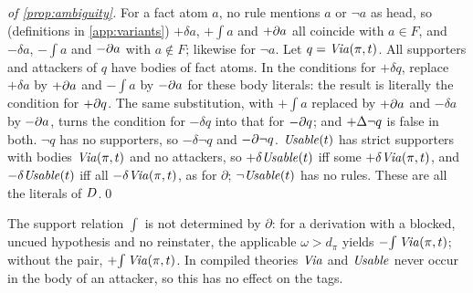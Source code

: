 \begin{proof}[of \cref{prop:ambiguity}]
For a fact atom $a$, no rule mentions $a$ or $\neg a$ as head, so (definitions in \cref{app:variants}) $+\delta a$, $+\!\int a$ and $+\partial a$ all coincide with $a\in F$, and $-\delta a$, $-\!\int a$ and $-\partial a$ with $a\notin F$; likewise for $\neg a$. Let $q=\mathit{Via}(\pi,t)$. All supporters and attackers of $q$ have bodies of fact atoms. In the conditions for $+\delta q$, replace $+\delta a$ by $+\partial a$ and $-\!\int a$ by $-\partial a$ for these body literals: the result is literally the condition for $+\partial q$. The same substitution, with $+\!\int a$ replaced by $+\partial a$ and $-\delta a$ by $-\partial a$, turns the condition for $-\delta q$ into that for $-\partial q$; and $+\Delta\neg q$ is false in both. $\neg q$ has no supporters, so $-\delta\neg q$ and $-\partial\neg q$. $\mathit{Usable}(t)$ has strict supporters with bodies $\mathit{Via}(\pi,t)$ and no attackers, so $+\delta\mathit{Usable}(t)$ iff some $+\delta\mathit{Via}(\pi,t)$, and $-\delta\mathit{Usable}(t)$ iff all $-\delta\mathit{Via}(\pi,t)$, as for $\partial$; $\neg\mathit{Usable}(t)$ has no rules. These are all the literals of $D$.\qed
\end{proof}

The support relation $\int$ is not determined by $\partial$: for a derivation with a blocked, uncued hypothesis and no reinstater, the applicable $\omega>d_\pi$ yields $-\!\int\mathit{Via}(\pi,t)$; without the pair, $+\!\int\mathit{Via}(\pi,t)$. In compiled theories $\mathit{Via}$ and $\mathit{Usable}$ never occur in the body of an attacker, so this has no effect on the tags.


